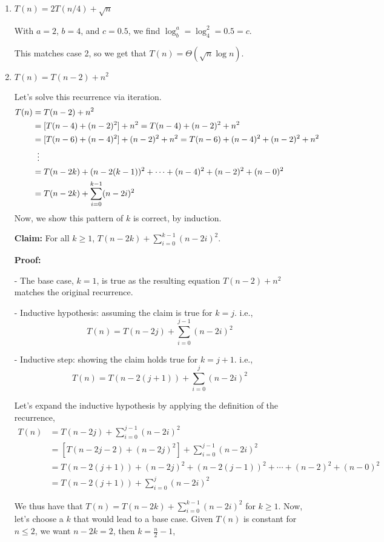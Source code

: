 \documentclass[11pt]{article}
\theoremstyle{definition}
\theoremstyle{theorem}
\newcommand{\solution}{\medskip\noindent{\color{DarkBlue}\textbf{Solution:}}}
\begin{document}
\begin{enumerate}[label=(\alph*)]
\item $T(n) = 2T(n/4) + \sqrt{n}$

\solution

With $a = 2$, $b = 4$, and $c = 0.5$, we find $\log_b^a = \log_4^2 = 0.5 = c$.

This matches case 2, so we get that $T(n) = \Theta(\sqrt{n} \log n)$.

\item $T(n) = T(n-2) + n^2$

\solution

Let's solve this recurrence via iteration.
\[
\begin{split}
T(n) & = T(n-2) + n^2 \\
& = {[T(n-4) + (n-2)^2]} + n^2 = T(n-4) + (n-2)^2 + n^2 \\ 
& = {[T(n-6) + (n-4)^2]} + (n-2)^2 + n^2 = T(n-6) + (n-4)^2 + (n-2)^2 + n^2 \\
&\;\;\vdots \notag \\
& = T(n-2k) + (n - 2(k-1))^2 + \cdots + (n-4)^2 + (n-2)^2 + (n-0)^2 \\
& = T(n-2k) + \sum_{i=0}^{k-1} (n - 2i)^2 
\end{split}
\]
Now, we show this pattern of $k$ is correct, by induction.

\textbf{Claim:} For all $k \geq 1$, $T(n-2k) + \sum_{i=0}^{k-1} (n - 2i)^2$.

\textbf{Proof:} 

- The base case, $k = 1$, is true as the resulting equation $T(n-2) + n^2$ matches the original recurrence.

- Inductive hypothesis: assuming the claim is true for $k = j$. i.e.,
\[
T(n) = T(n-2j) + \sum_{i=0}^{j-1} (n - 2i)^2
\]

- Inductive step: showing the claim holds true for $k = j + 1$. i.e.,
\[
T(n) = T(n-2(j+1)) + \sum_{i=0}^{j} (n - 2i)^2
\]

Let's expand the inductive hypothesis by applying the definition of the recurrence,
\[
\begin{split}
T(n) & = T(n-2j) + \sum_{i=0}^{j-1} (n - 2i)^2 \\
& = [T(n-2j-2) + (n-2j)^2] + \sum_{i=0}^{j-1} (n - 2i)^2 \\
& = T(n-2(j+1)) + (n-2j)^2 + (n-2(j-1))^2 + \cdots + (n-2)^2 + (n-0)^2 \\
& = T(n-2(j+1)) + \sum_{i=0}^{j} (n - 2i)^2
\end{split}
\]

We thus have that $T(n) = T(n-2k) + \sum_{i=0}^{k-1} (n - 2i)^2$ for $k \geq 1$. Now, let's choose a $k$ that would lead to a base case. Given $T(n)$ is constant for $n \leq 2$, we want $n-2k = 2$, then $k = \frac{n}{2} - 1$,


\end{enumerate}
\end{document}
